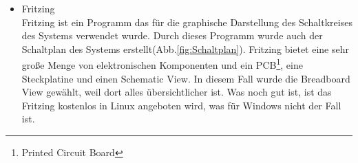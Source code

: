 \begin{itemize}
		\item Fritzing \\
		Fritzing ist ein Programm das für die graphische Darstellung des Schaltkreises des Systems verwendet wurde. Durch dieses Programm wurde auch der Schaltplan des Systems erstellt(Abb.\ref{fig:Schaltplan}). Fritzing bietet eine sehr große Menge von elektronischen Komponenten und ein PCB\footnote{Printed Circuit Board}, eine Steckplatine und einen Schematic View. In diesem Fall wurde die Breadboard View gewählt, weil dort alles übersichtlicher ist. Was noch gut ist, ist das Fritzing kostenlos in Linux angeboten wird, was für Windows nicht der Fall ist.\cite{Fritzing}
\end{itemize}	
	
